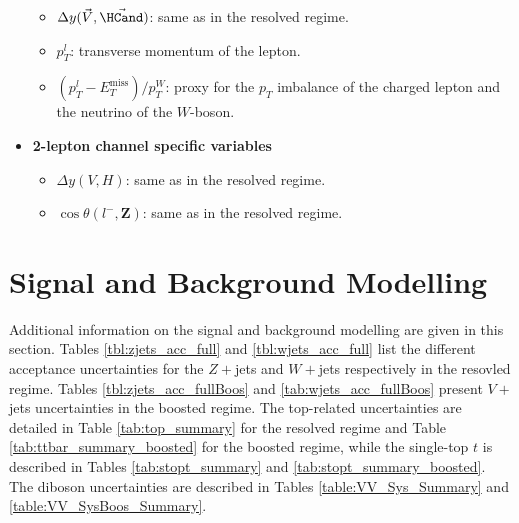 \begin{itemize}
  \begin{itemize}
      \item $\Delta y(\vec{V},\vec{\HCand})$: same as in the resolved regime.
      \item $p_T^l$: transverse momentum of the lepton.
      \item $(p_T^{l} - E_T^{\textrm{miss}})/p_T^W$:  proxy for the $p_T$ imbalance of the charged lepton and the neutrino of the $W$-boson.
  \end{itemize}
  \item \textbf{2-lepton channel specific variables}
  \begin{itemize}
      \item $\Delta y(\textbf{$V$},\textbf{$H$})$: same as in the resolved regime.
      \item $\cos{\theta(\textbf{$l^-$},\textbf{Z})}$: same as in the resolved regime.
  \end{itemize}
\end{itemize}


\section{Signal and Background Modelling}\label{appsec-vh-backsigmod}
Additional information on the signal and background modelling are given in this section. Tables \ref{tbl:zjets_acc_full} and \ref{tbl:wjets_acc_full} list the different acceptance uncertainties for the $Z+$jets and $W+$jets respectively in the resovled regime. Tables \ref{tbl:zjets_acc_fullBoos} and \ref{tab:wjets_acc_fullBoos} present $V+$jets uncertainties in the boosted regime. The top-related uncertainties are detailed in Table \ref{tab:top_summary} for the resolved regime and Table \ref{tab:ttbar_summary_boosted} for the boosted regime, while the single-top $t$ is described in Tables \ref{tab:stopt_summary} and \ref{tab:stopt_summary_boosted}. The diboson uncertainties are described in Tables \ref{table:VV_Sys_Summary} and \ref{table:VV_SysBoos_Summary}.












\clearpage

